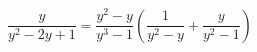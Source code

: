 \begin{ex}[type=equation]
	\begin{condition}
		$\dfrac{y}{y^2 - 2y + 1} = \dfrac{y^2 - y}{y^3 - 1}\left(\dfrac{1}{y^2 - y} + \dfrac{y}{y^2 - 1}\right)$
	\end{condition}
\end{ex}
